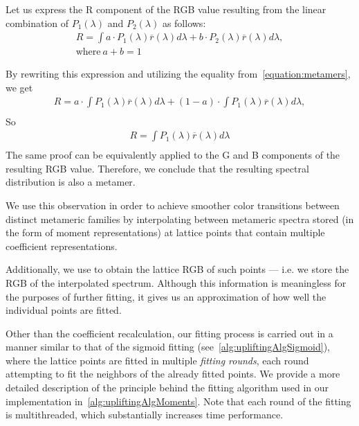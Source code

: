 Let us express the R component of the RGB value resulting from the linear combination of $P_1(\lambda)$ and $P_2(\lambda)$ as follows:
\begin{equation}
\begin{aligned}
R = \int a \cdot P_1(\lambda)\overline{r}(\lambda)d\lambda + 
b \cdot P_2(\lambda)\overline{r}(\lambda)d\lambda,\\
\text{where}\ a + b = 1
\end{aligned}
\end{equation}

By rewriting this expression and utilizing the equality from~\cref{equation:metamers}, we get
\begin{equation*}
\begin{aligned}
R = a \cdot \int P_1(\lambda)\overline{r}(\lambda)d\lambda +
(1-a) \cdot \int P_1(\lambda)\overline{r}(\lambda)d\lambda,\\
\end{aligned}
\end{equation*}
So
\begin{equation*}
\begin{aligned}
R = \int P_1(\lambda)\overline{r}(\lambda)d\lambda\\
\end{aligned}
\end{equation*}
The same proof can be equivalently applied to the G and B components of the resulting RGB value. Therefore, we conclude that the resulting spectral distribution is also a metamer.

We use this observation in order to achieve smoother color transitions between distinct metameric families by interpolating between metameric spectra stored (in the form of moment representations) at lattice points that contain multiple coefficient representations.

Additionally, we use to obtain the lattice RGB of such points --- i.e. we store the RGB of the interpolated spectrum. Although this information is meaningless for the purposes of further fitting, it gives us an approximation of how well the individual points are fitted.

Other than the coefficient recalculation, our fitting process is carried out in a manner similar to that of the sigmoid fitting (see~\cref{alg:upliftingAlgSigmoid}), where the lattice points are fitted in multiple \emph{fitting rounds}, each round attempting to fit the neighbors of the already fitted points. We provide a more detailed description of the principle behind the fitting algorithm used in our implementation in~\cref{alg:upliftingAlgMoments}. Note that each round of the fitting is multithreaded, which substantially increases time performance.

